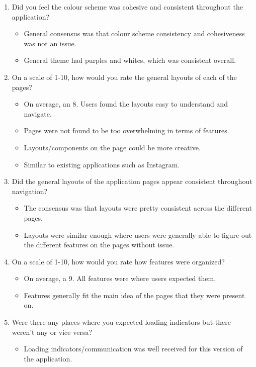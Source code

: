 \documentclass[12pt, titlepage]{article}
\begin{document}
\begin{enumerate}
  \item Did you feel the colour scheme was cohesive and consistent throughout the application?
    \begin{itemize}
      \item General consensus was that colour scheme consistency and cohesiveness was not an issue.
      \item General theme had purples and whites, which was consistent overall.
    \end{itemize}
  \item On a scale of 1-10, how would you rate the general layouts of each of the pages?
    \begin{itemize}
      \item On average, an 8. Users found the layouts easy to understand and navigate.
      \item Pages were not found to be too overwhelming in terms of features.
      \item Layouts/components on the page could be more creative.
      \item Similar to existing applications such as Instagram.
    \end{itemize}
  \item Did the general layouts of the application pages appear consistent throughout navigation?
    \begin{itemize}
      \item The consensus was that layouts were pretty consistent across the different pages.
      \item Layouts were similar enough where users were generally able to figure out the different
      features on the pages without issue.
    \end{itemize}
  \item On a scale of 1-10, how would you rate how features were organized?
    \begin{itemize}
      \item On average, a 9. All features were where users expected them.
      \item Features generally fit the main idea of the pages that they were present on.
    \end{itemize}
  \item Were there any places where you expected loading indicators but there weren't any or vice versa?
    \begin{itemize}
      \item Loading indicators/communication was well received for this version of the application.

\end{itemize}
\end{enumerate}
\end{document}
